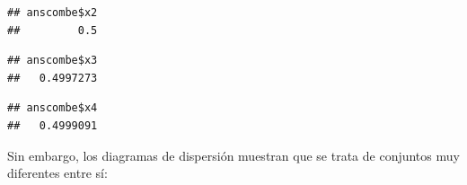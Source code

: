 \documentclass[]{book}
\newenvironment{Shaded}{\begin{snugshade}}{\end{snugshade}}
\newcommand{\DecValTok}[1]{\textcolor[rgb]{0.00,0.00,0.81}{#1}}
\newcommand{\KeywordTok}[1]{\textcolor[rgb]{0.13,0.29,0.53}{\textbf{#1}}}
\newcommand{\NormalTok}[1]{#1}
\newcommand{\OperatorTok}[1]{\textcolor[rgb]{0.81,0.36,0.00}{\textbf{#1}}}
\newcommand{\StringTok}[1]{\textcolor[rgb]{0.31,0.60,0.02}{#1}}
\begin{document}
\begin{Shaded}
\end{Shaded}

\begin{verbatim}
## anscombe$x2 
##         0.5
\end{verbatim}

\begin{Shaded}
\end{Shaded}

\begin{verbatim}
## anscombe$x3 
##   0.4997273
\end{verbatim}

\begin{Shaded}
\end{Shaded}

\begin{verbatim}
## anscombe$x4 
##   0.4999091
\end{verbatim}

Sin embargo, los diagramas de dispersión muestran que se trata de conjuntos muy diferentes entre sí:
\end{document}
